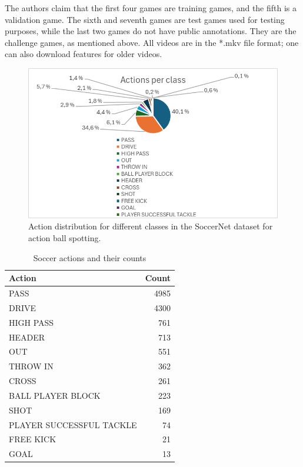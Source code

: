 The authors claim that the first four games are training games, and the fifth is a validation game. The sixth and seventh games are test games used for testing purposes, while the last two games do not have public annotations. They are the challenge games, as mentioned above. All videos are in the *.mkv file format; one can also download features for older videos. 

\begin{figure}
    \centering
    \includegraphics[width=1\linewidth]{figures/actions_per_class_2.png}
    \caption{Action distribution for different classes in the SoccerNet dataset for action ball spotting. }
    \label{fig:soccernet_dist}
\end{figure}

\begin{table}[h]
    \centering
    \begin{tabular}{lr}
        \toprule
        Action                    & Count \\
        \midrule
        PASS                      & 4985  \\
        DRIVE                     & 4300  \\
        HIGH PASS                 & 761   \\
        HEADER                    & 713   \\
        OUT                       & 551   \\
        THROW IN                  & 362   \\
        CROSS                     & 261   \\
        BALL PLAYER BLOCK         & 223   \\
        SHOT                      & 169   \\
        PLAYER SUCCESSFUL TACKLE  & 74    \\
        FREE KICK                 & 21    \\
        GOAL                      & 13    \\
        \bottomrule
    \end{tabular}
    \caption{Soccer actions and their counts}
    \label{tab:soccer_actions}
\end{table}

